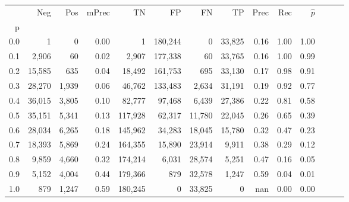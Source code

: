 \begin{tabular}{rrrrrrrrrrrrrr}
\toprule
{} &     Neg &    Pos & mPrec &       TN &       FP &      FN &      TP &  Prec &   Rec & $\hat{p}$ \\
p   &         &        &       &          &          &         &         &       &       &           \\
\midrule
0.0 &       1 &      0 &  0.00 &        1 &  180,244 &       0 &  33,825 &  0.16 &  1.00 &      1.00 \\
0.1 &   2,906 &     60 &  0.02 &    2,907 &  177,338 &      60 &  33,765 &  0.16 &  1.00 &      0.99 \\
0.2 &  15,585 &    635 &  0.04 &   18,492 &  161,753 &     695 &  33,130 &  0.17 &  0.98 &      0.91 \\
0.3 &  28,270 &  1,939 &  0.06 &   46,762 &  133,483 &   2,634 &  31,191 &  0.19 &  0.92 &      0.77 \\
0.4 &  36,015 &  3,805 &  0.10 &   82,777 &   97,468 &   6,439 &  27,386 &  0.22 &  0.81 &      0.58 \\
0.5 &  35,151 &  5,341 &  0.13 &  117,928 &   62,317 &  11,780 &  22,045 &  0.26 &  0.65 &      0.39 \\
0.6 &  28,034 &  6,265 &  0.18 &  145,962 &   34,283 &  18,045 &  15,780 &  0.32 &  0.47 &      0.23 \\
0.7 &  18,393 &  5,869 &  0.24 &  164,355 &   15,890 &  23,914 &   9,911 &  0.38 &  0.29 &      0.12 \\
0.8 &   9,859 &  4,660 &  0.32 &  174,214 &    6,031 &  28,574 &   5,251 &  0.47 &  0.16 &      0.05 \\
0.9 &   5,152 &  4,004 &  0.44 &  179,366 &      879 &  32,578 &   1,247 &  0.59 &  0.04 &      0.01 \\
1.0 &     879 &  1,247 &  0.59 &  180,245 &        0 &  33,825 &       0 &   nan &  0.00 &      0.00 \\
\bottomrule
\end{tabular}
